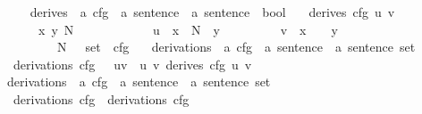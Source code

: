 \begin{isabellebody}
\ \ \ \isanewline
{}\isamarkupfalse%
\ derives{}\ {\isacharcolon}{\kern0pt}{\isacharcolon}{\kern0pt}\ {\isachardoublequoteopen}{\isacharprime}{\kern0pt}a\ cfg\ {\isasymRightarrow}\ {\isacharprime}{\kern0pt}a\ sentence\ {\isasymRightarrow}\ {\isacharprime}{\kern0pt}a\ sentence\ {\isasymRightarrow}\ bool{\isachardoublequoteclose}\ \isanewline
\ \ {\isachardoublequoteopen}derives{}\ cfg\ u\ v\ {\isacharequal}{\kern0pt}\ \isanewline
\ \ \ \ \ {\isacharparenleft}{\kern0pt}{\isasymexists}\ x\ y\ N\ {\isasymalpha}{\isachardot}{\kern0pt}\ \isanewline
\ \ \ \ \ \ \ \ \ \ u\ {\isacharequal}{\kern0pt}\ x\ {\isacharat}{\kern0pt}\ {\isacharbrackleft}{\kern0pt}N{\isacharbrackright}{\kern0pt}\ {\isacharat}{\kern0pt}\ y\isanewline
\ \ \ \ \ \ \ \ {\isasymand}\ v\ {\isacharequal}{\kern0pt}\ x\ {\isacharat}{\kern0pt}\ {\isasymalpha}\ {\isacharat}{\kern0pt}\ y\isanewline
\ \ \ \ \ \ \ \ {\isasymand}\ {\isacharparenleft}{\kern0pt}N{\isacharcomma}{\kern0pt}\ {\isasymalpha}{\isacharparenright}{\kern0pt}\ {\isasymin}\ set\ {\isacharparenleft}{\kern0pt}{\isasymRR}\ cfg{\isacharparenright}{\kern0pt}{\isacharparenright}{\kern0pt}{\isachardoublequoteclose}\ \ \isanewline
\isanewline
{}\isamarkupfalse%
\ derivations{}\ {\isacharcolon}{\kern0pt}{\isacharcolon}{\kern0pt}\ {\isachardoublequoteopen}{\isacharprime}{\kern0pt}a\ cfg\ {\isasymRightarrow}\ {\isacharparenleft}{\kern0pt}{\isacharprime}{\kern0pt}a\ sentence\ {\isasymtimes}\ {\isacharprime}{\kern0pt}a\ sentence{\isacharparenright}{\kern0pt}\ set{\isachardoublequoteclose}\ \isanewline
\ \ {\isachardoublequoteopen}derivations{}\ cfg\ {\isacharequal}{\kern0pt}\ {\isacharbraceleft}{\kern0pt}\ {\isacharparenleft}{\kern0pt}u{\isacharcomma}{\kern0pt}v{\isacharparenright}{\kern0pt}\ {\isacharbar}{\kern0pt}\ u\ v{\isachardot}{\kern0pt}\ derives{}\ cfg\ u\ v\ {\isacharbraceright}{\kern0pt}{\isachardoublequoteclose}\isanewline
\isanewline
{}\isamarkupfalse%
\ derivations\ {\isacharcolon}{\kern0pt}{\isacharcolon}{\kern0pt}\ {\isachardoublequoteopen}{\isacharprime}{\kern0pt}a\ cfg\ {\isasymRightarrow}\ {\isacharparenleft}{\kern0pt}{\isacharprime}{\kern0pt}a\ sentence\ {\isasymtimes}\ {\isacharprime}{\kern0pt}a\ sentence{\isacharparenright}{\kern0pt}\ set{\isachardoublequoteclose}\ \ \isanewline
\ \ {\isachardoublequoteopen}derivations\ cfg\ {\isacharequal}{\kern0pt}\ {\isacharparenleft}{\kern0pt}derivations{}\ cfg{\isacharparenright}{\kern0pt}{\isacharcircum}{\kern0pt}{\isacharasterisk}{\kern0pt}{\isachardoublequoteclose}\isanewline

\end{isabellebody}
